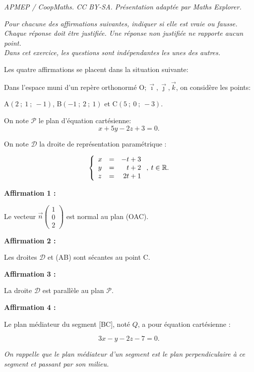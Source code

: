 \documentclass[10pt]{article}
\providecommand{\R}{\mathbb{R}}
\providecommand{\vect}[1]{\overrightarrow{#1}}
\providecommand{\Oijk}{\(\mathrm{O};\vec{\imath},\vec{\jmath},\vec{k}\)}
\begin{document}
\noindent\textit{APMEP / CoopMaths. CC BY-SA. Présentation adaptée par Maths Explorer.}\par\medskip
\medskip

\emph{Pour chacune des affirmations suivantes, indiquer si elle est vraie ou fausse.\\
Chaque réponse doit être justifiée. Une réponse non justifiée ne rapporte aucun point.\\
Dans cet exercice, les questions sont indépendantes les unes des autres.}

\medskip

Les quatre affirmations se placent dans la situation suivante:

Dans l'espace muni d'un repère orthonormé \Oijk, on considère les points: 
\begin{center}A$(2~;~1~;~-1)$, \quad B$(-1~;~2~;~1)$ et \quad C$(5~;~0~;~-3)$.\end{center}

On note $\mathcal{P}$ le plan d'équation cartésienne:
\[x + 5y - 2z + 3 = 0.\]

On note $\mathcal{D}$ la droite de représentation paramétrique :

\[\left\{\begin{array}{l c r}
x&=&-t +3\\
y&=&t+ 2\\
z &=& 2t +1
\end{array}\right., \: t \in \R.\]

\medskip

\textbf{Affirmation 1 :}

Le vecteur $\vect{n}\begin{pmatrix}1\\0\\2\end{pmatrix}$ est normal au plan (OAC).

\medskip

\textbf{Affirmation 2 :}

Les droites $\mathcal{D}$ et (AB) sont sécantes au point C.

\medskip

\textbf{Affirmation 3 :}

La droite $\mathcal{D}$ est parallèle au plan $\mathcal{P}$.

\medskip

\textbf{Affirmation 4 :}

Le plan médiateur du segment [BC], noté $Q$, a pour équation cartésienne :

\[3x - y - 2z - 7 = 0.\]

\emph{On rappelle que le plan médiateur d'un segment est le plan perpendiculaire à ce segment et passant par son milieu.}

\bigskip
\end{document}
